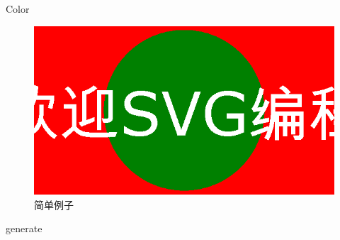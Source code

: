 \documentclass[main.tex]{subfiles}
\begin{document}
Color
\begin{figure}
	\centering
	\includegraphics[width=0.5\columnwidth]{images/svg/simple_example.eps}
	\caption{简单例子}
	\label{fig:I.1.}
\end{figure}

generate 
\end{document}
